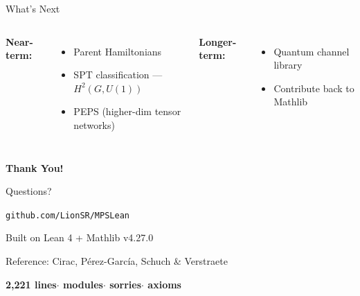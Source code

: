 \documentclass[aspectratio=169,10pt]{beamer}
\begin{document}
\begin{frame}{What's Next}
\vspace{-0.3em}
\begin{columns}[T]
{\small\textbf{Near-term:}}
\begin{itemize}\itemsep0.05em
  \item {\small Parent Hamiltonians}
  \item {\small SPT classification --- $H^2(G,U(1))$}
  \item {\small PEPS (higher-dim tensor networks)}
\end{itemize}

{\small\textbf{Longer-term:}}
\begin{itemize}\itemsep0.05em
  \item {\small Quantum channel library}
  \item {\small Contribute back to Mathlib}
\end{itemize}
\end{columns}

\vspace{0.5em}
\begin{center}
\end{center}
\end{frame}

\begin{frame}
\begin{center}
\vspace{1em}
\Huge\textbf{\textcolor{leangreen}{Thank You!}}

\vspace{1em}
\LARGE Questions?

\vspace{1.2em}
\large\texttt{github.com/LionSR/MPSLean}

\vspace{0.4em}
\normalsize Built on Lean 4 + Mathlib v4.27.0

\vspace{0.3em}
{\small Reference: Cirac, P{\'e}rez-Garc{\'i}a, Schuch \& Verstraete \cite{Cirac2021Matrix}}

\vspace{0.8em}
\textcolor{leangreen}{\textbf{2,221 lines\quad$\cdot$ modules\quad$\cdot$ sorries\quad$\cdot$ axioms}}
\end{center}
\end{frame}
\end{document}
